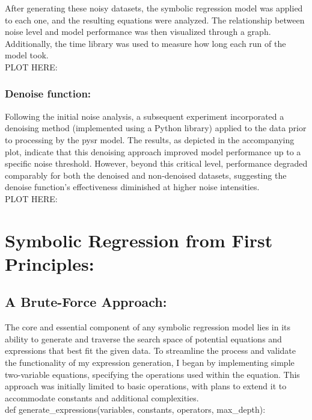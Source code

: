 \documentclass{article}
\begin{document}
After generating these noisy datasets, the symbolic regression model was applied to each one, and the resulting equations were analyzed. The relationship between noise level and model performance was then visualized through a graph. Additionally, the time library was used to measure how long each run of the model took.\\

PLOT HERE:\\

\subsubsection{Denoise function: }

    Following the initial noise analysis, a subsequent experiment incorporated a denoising method (implemented using a Python library) applied to the data prior to processing by the pysr model. The results, as depicted in the accompanying plot, indicate that this denoising approach improved model performance up to a specific noise threshold. However, beyond this critical level, performance degraded comparably for both the denoised and non-denoised datasets, suggesting the denoise function's effectiveness diminished at higher noise intensities.\\

PLOT HERE:\\

\section{Symbolic Regression from First Principles: }


\subsection{A Brute-Force Approach: }

The core and essential component of any symbolic regression model lies in its ability to generate and traverse the search space of potential equations and expressions that best fit the given data. To streamline the process and validate the functionality of my expression generation, I began by implementing simple two-variable equations, specifying the operations used within the equation. This approach was initially limited to basic operations, with plans to extend it to accommodate constants and additional complexities.\\

def generate_expressions(variables, constants, operators, max_depth):
    
\end{document}
